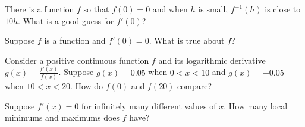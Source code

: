 \documentclass{ximera}
\newcommand{\recommendation}[1]{}
\begin{document}
\begin{shuffle}
\begin{problem}
  There is a function $f$ so that $f(0) = 0$ and when $h$ is small, $f^{-1}(h)$ is close to $10 h$.  What is a good guess for $f'(0)$?
  \begin{multipleChoice}
  \end{multipleChoice}
\end{problem}

\begin{problem}
  Suppose $f$ is a function and $f'(0) = 0$.  What is true about $f$?
  \begin{multipleChoice}
  \end{multipleChoice}
\end{problem}



\begin{problem}
  Consider a positive continuous function $f$ and its logarithmic derivative $g(x) = \frac{f'(x)}{f(x)}$.  Suppose $g(x) = 0.05$ when $0 < x < 10$ and $g(x) = -0.05$ when $10 < x < 20$.  How do $f(0)$ and $f(20)$ compare?
  \begin{multipleChoice}
  \end{multipleChoice}
\end{problem}



\begin{problem}
  Suppose $f'(x) = 0$ for infinitely many different values of $x$.  How many local minimums and maximums does $f$ have?
  \begin{multipleChoice}
  \end{multipleChoice}
\end{problem}


\end{shuffle}
\end{document}
